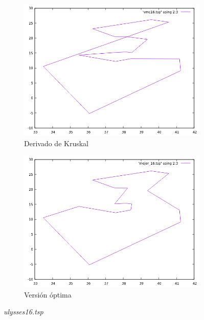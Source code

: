 \documentclass[12pt,spanish]{article}
\begin{document}
\begin{figure}[H]
\begin{subfigure}[b]{0.36\textwidth}
\includegraphics[width=\textwidth]{ulysses16_vmc.png}
\caption{Derivado de Kruskal}
\end{subfigure}
\quad
\begin{subfigure}[b]{0.36\textwidth}
\includegraphics[width=\textwidth]{ulysses16_mejor.png}
\caption{Versión óptima}
\end{subfigure}
\caption{\textit{ulysses16.tsp}}
\end{figure}
\end{document}
